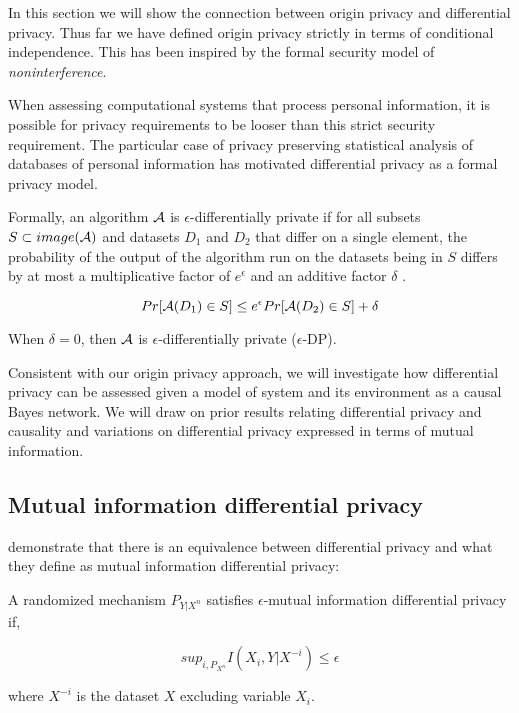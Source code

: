 \documentclass[../thesis.tex]{subfiles}
\begin{document}
In this section we will show the connection between
origin privacy and differential privacy.
Thus far we have defined origin privacy strictly in
terms of conditional independence.
This has been inspired by the formal security model
of \emph{noninterference}.

When assessing computational systems that process
personal information, it is possible for privacy
requirements to be looser than this strict security
requirement.
The particular case of privacy preserving statistical
analysis of databases of personal information has
motivated differential privacy as a formal privacy
model. \cite{dwork06icalp,dwork08jpc}

Formally, an algorithm $\mathcal{A}$ is $\epsilon$-differentially private
if for all subsets $S \subset image(\mathcal{A})$ and
datasets $D_1$ and $D_2$ that differ on a single element,
the probability of the output of the algorithm run
on the datasets being in $S$ differs by at most a
multiplicative factor of $e^\epsilon$ and an additive
factor $\delta$ \cite{dwork2014algorithmic}. 

\begin{dfn}
$$Pr[\mathcal{A}(D_1) \in S] \leq e^\epsilon Pr[\mathcal{A}(D_2) \in S] + \delta$$
\end{dfn}

When $\delta = 0$, then $\mathcal{A}$ is $\epsilon$-differentially
private ($\epsilon$-DP).

Consistent with our origin privacy approach, we will
investigate how differential privacy can be assessed
given a model of system and its environment as a
causal Bayes network.
We will draw on prior results relating differential
privacy and causality and variations on differential
privacy expressed in terms of mutual information.

\subsection{Mutual information differential privacy}

\citet{cuff2016differential} demonstrate that there is
an equivalence between differential privacy and what they define
as mutual information differential privacy:

\begin{dfn}
  A randomized mechanism $P_{Y \vert X^n}$ satisfies $\epsilon$-mutual
  information differential privacy if,

  $$sup_{i, P_{X^n}} I(X_i, Y \vert X^{-i}) \leq \epsilon$$

  where $X^{-i}$ is the dataset $X$ excluding variable
  $X_i$.
\end{dfn}
\end{document}
